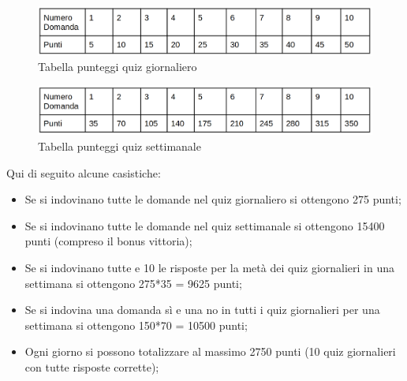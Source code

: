 \documentclass{article}
\begin{document}
\begin{figure}[htp]
\begin{center}
\includegraphics[width=0.75 \textwidth]{tabella giornaliero.png}
\caption{Tabella punteggi quiz giornaliero}
\end{center}
\end{figure}

\begin{figure}[htp]
\begin{center}
\includegraphics[width=0.75 \textwidth]{tabella settimanale.png}
\caption{Tabella punteggi quiz settimanale}
\end{center}
\end{figure}

Qui di seguito alcune casistiche:
\begin{itemize}
\item Se si indovinano tutte le domande nel quiz giornaliero si ottengono 275 punti;
\item Se si indovinano tutte le domande nel quiz settimanale si ottengono 15400 punti (compreso il bonus vittoria);
\item Se si indovinano tutte e 10 le risposte per la metà dei quiz giornalieri in una settimana si ottengono 275*35 = 9625 punti;
\item Se si indovina una domanda sì e una no in tutti i quiz giornalieri per una settimana si ottengono 150*70 = 10500 punti;
\item Ogni giorno si possono totalizzare al massimo 2750 punti (10 quiz giornalieri con tutte risposte corrette);
\end{itemize}
\end{document}
